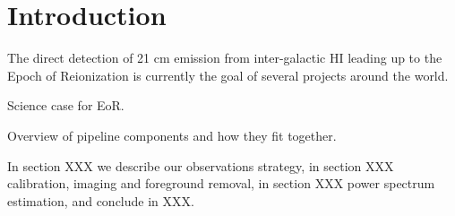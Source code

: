 \section{Introduction} 
The direct detection of 21 cm emission from inter-galactic HI leading up to the Epoch of Reionization is currently the goal of several projects around the world. 

Science case for EoR.

Overview of pipeline components and how they fit together.

In section XXX we describe our observations strategy, in section XXX calibration, imaging and foreground removal, in section XXX power spectrum estimation, and conclude in XXX.